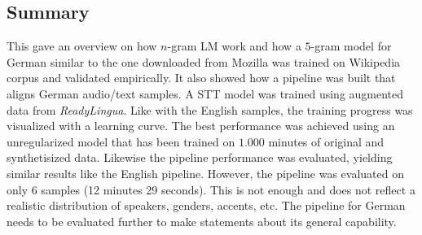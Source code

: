 \subsection{Summary}

This gave an overview on how $n$-gram \ac{LM} work and how a $5$-gram model for German similar to the one downloaded from Mozilla was trained on Wikipedia corpus and validated empirically. It also showed how a pipeline was built that aligns German audio/text samples. A \ac{STT} model was trained using augmented data from \textit{ReadyLingua}. Like with the English samples, the training progress was visualized with a learning curve. The best performance was achieved using an unregularized model that has been trained on $1.000$ minutes of original and synthetisized data. Likewise the pipeline performance was evaluated, yielding similar results like the English pipeline. However, the pipeline was evaluated on only 6 samples (12 minutes 29 seconds). This is not enough and does not reflect a realistic distribution of speakers, genders, accents, etc. The pipeline for German needs to be evaluated further to make statements about its general capability.